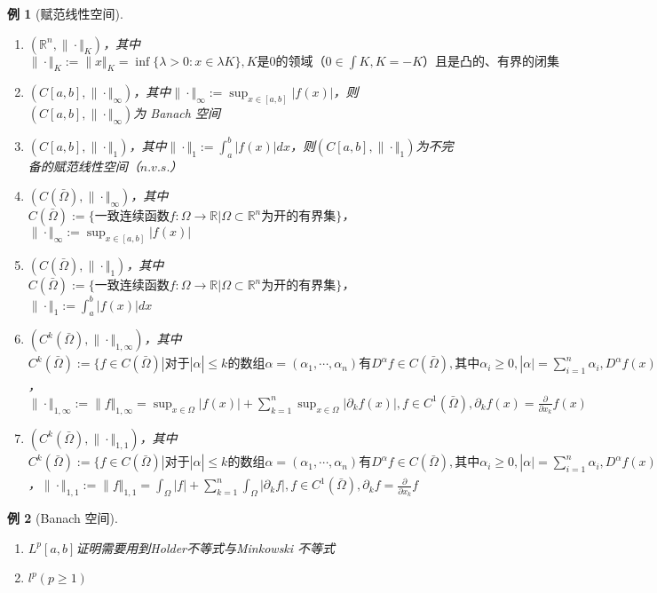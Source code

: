\documentclass{article}                     %
\numberwithin{equation}{section}            %
\numberwithin{figure}{section}              %
\numberwithin{table}{section}               %
\newtheorem{example}{\indent 例}[section]
\begin{document}
\begin{example}[赋范线性空间]
    \begin{enumerate}
        \item $(\mathbb{R} ^n,\| \cdot \Vert_{K} )$，其中$\| \cdot \Vert_{K} :=\| x \Vert_{K}=\inf\{\lambda >0:x\in \lambda K\} ,K\mbox{是$0$的领域（$0\in \int{K},K=-K$）且是凸的、有界的闭集}$
        \item $(C[a,b],\| \cdot \Vert_{\infty} )$，其中$\| \cdot \Vert_{\infty} :=\sup_{x\in [a,b]}|f(x)|$，则$(C[a,b],\| \cdot \Vert_{\infty} )$为 Banach 空间
        \item $(C[a,b],\| \cdot \Vert_{1} )$，其中$\| \cdot \Vert_{1} :=\int_{a}^{b}|f(x)|dx$，则$(C[a,b],\| \cdot \Vert_{1} )$为不完备的赋范线性空间（$n.v.s.$）
        \item $(C(\bar{\Omega } ),\| \cdot \Vert_{\infty} )$，其中$C(\bar{\Omega } ):=\{\mbox{一致连续函数}f:\Omega \to \mathbb{R} |\Omega \subset \mathbb{R} ^n\mbox{为开的有界集}\}$，$\| \cdot \Vert_{\infty} :=\sup_{x\in [a,b]}|f(x)|$
        \item $(C(\bar{\Omega } ),\| \cdot \Vert_{1} )$，其中$C(\bar{\Omega } ):=\{\mbox{一致连续函数}f:\Omega \to \mathbb{R} |\Omega \subset \mathbb{R} ^n\mbox{为开的有界集}\}$，$\| \cdot \Vert_{1} :=\int_{a}^{b}|f(x)|dx$
        \item $(C^k(\bar{\Omega } ),\| \cdot \Vert_{1,\infty} )$，其中$C^k(\bar{\Omega } ):=\{f\in C(\bar{\Omega }) |\mbox{对于}|\alpha |\le k \mbox{的数组}\alpha =(\alpha_1,\cdots,\alpha_n)\mbox{有}D^{\alpha }f\in C(\bar{\Omega }),\mbox{其中}\alpha _i\ge 0,|\alpha |= {\textstyle \sum_{i=1}^{n}}\alpha _i ,D^\alpha f(x)=\frac{\partial ^{|\alpha |}}{{\partial x_1}^{|\alpha _1|}\cdots {\partial x_n}^{|\alpha_n |}} \}$，$\| \cdot \Vert_{1,\infty}:=\| f \Vert_{1,\infty}=\sup _{x\in\Omega} |f(x)|+ {\textstyle \sum_{k=1}^{n}} \sup _{x\in\Omega} |\partial_k f(x)|,f\in C^1(\bar{\Omega }),\partial _kf(x)=\frac{\partial}{\partial x_k}f(x) $
        \item $(C^k(\bar{\Omega } ),\| \cdot \Vert_{1,1} )$，其中$C^k(\bar{\Omega } ):=\{f\in C(\bar{\Omega }) |\mbox{对于}|\alpha |\le k \mbox{的数组}\alpha =(\alpha_1,\cdots,\alpha_n)\mbox{有}D^{\alpha }f\in C(\bar{\Omega }),\mbox{其中}\alpha _i\ge 0,|\alpha |= {\textstyle \sum_{i=1}^{n}}\alpha _i ,D^\alpha f(x)=\frac{\partial ^{|\alpha |}}{{\partial x_1}^{|\alpha _1|}\cdots {\partial x_n}^{|\alpha_n |}} \}$，$\| \cdot \Vert_{1,1}:=\| f \Vert_{1,1}=\int _\Omega |f|+ {\textstyle \sum_{k=1}^{n}} \int _\Omega |\partial_k f| ,f\in C^1(\bar{\Omega }),\partial _kf=\frac{\partial}{\partial x_k}f $
    \end{enumerate}
\end{example}
\begin{example}[Banach 空间]
    \begin{enumerate}
        \item $L^p[a,b]$证明需要用到Holder不等式与Minkowski 不等式
        \item $l^p(p\ge 1)$
    \end{enumerate}
\end{example}
\end{document}
